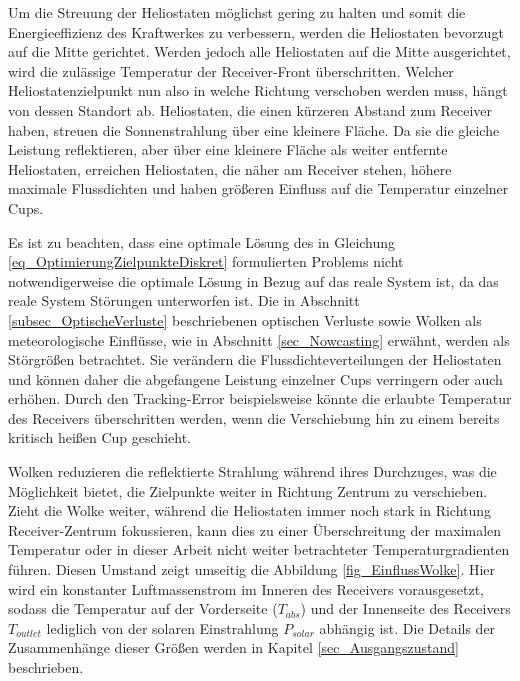 Um die Streuung der Heliostaten möglichst gering zu halten und somit die Energieeffizienz des Kraftwerkes zu verbessern, werden die Heliostaten bevorzugt auf die Mitte gerichtet.
Werden jedoch alle Heliostaten auf die Mitte ausgerichtet, wird die zulässige Temperatur der Receiver-Front überschritten.
Welcher Heliostatenzielpunkt nun also in welche Richtung verschoben werden muss, hängt von dessen Standort ab.
Heliostaten, die einen kürzeren Abstand zum Receiver haben, streuen die Sonnenstrahlung über eine kleinere Fläche.
Da sie die gleiche Leistung reflektieren, aber über eine kleinere Fläche als weiter entfernte Heliostaten, erreichen Heliostaten, die näher am Receiver stehen, höhere maximale Flussdichten und haben größeren Einfluss auf die Temperatur einzelner Cups.

Es ist zu beachten, dass eine optimale Lösung des in Gleichung \ref{eq_OptimierungZielpunkteDiskret} formulierten Problems nicht notwendigerweise die optimale Lösung in Bezug auf das reale System ist, da das reale System Störungen unterworfen ist.
Die in Abschnitt \ref{subsec_OptischeVerluste} beschriebenen optischen Verluste sowie Wolken als meteorologische Einflüsse, wie in Abschnitt \ref{sec_Nowcasting} erwähnt, werden als Störgrößen betrachtet.
Sie verändern die Flussdichteverteilungen der Heliostaten und können daher die abgefangene Leistung einzelner Cups verringern oder auch erhöhen.
Durch den Tracking-Error beispielsweise könnte die erlaubte Temperatur des Receivers überschritten werden, wenn die Verschiebung hin zu einem bereits kritisch heißen Cup geschieht. \cite[S.16]{DissZanger}

Wolken reduzieren die reflektierte Strahlung während ihres Durchzuges, was die Möglichkeit bietet, die Zielpunkte weiter in Richtung Zentrum zu verschieben.
Zieht die Wolke weiter, während die Heliostaten immer noch stark in Richtung Receiver-Zentrum fokussieren, kann dies zu einer Überschreitung der maximalen Temperatur oder in dieser Arbeit nicht weiter betrachteter Temperaturgradienten führen.
Diesen Umstand zeigt umseitig die Abbildung \ref{fig_EinflussWolke}.
Hier wird ein konstanter Luftmassenstrom im Inneren des Receivers vorausgesetzt, sodass die Temperatur auf der Vorderseite ($T_{abs}$) und der Innenseite des Receivers $T_{outlet}$ lediglich von der solaren Einstrahlung $P_{solar}$ abhängig ist.
Die Details der Zusammenhänge dieser Größen werden in Kapitel \ref{sec_Ausgangszustand} beschrieben.

